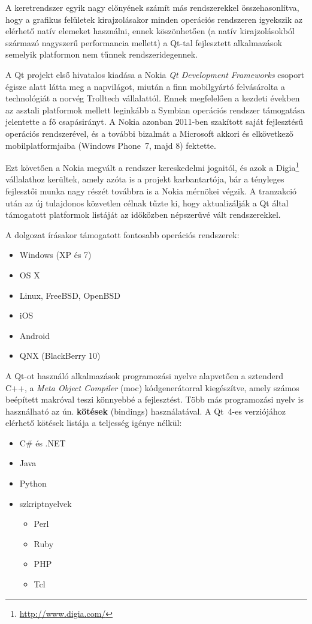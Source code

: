 A keretrendszer egyik nagy előnyének számít más rendszerekkel összehasonlítva, hogy a grafikus felületek kirajzolásakor minden operációs rendszeren igyekszik az elérhető natív elemeket használni, ennek köszönhetően (a natív kirajzolásokból származó nagyszerű performancia mellett) a Qt-tal fejlesztett alkalmazások semelyik platformon nem tűnnek rendszeridegennek.

\bigskip

A Qt projekt első hivatalos kiadása a Nokia \emph{Qt Development Frameworks} csoport égisze alatt látta meg a napvilágot, miután a finn mobilgyártó felvásárolta a technológiát a norvég Trolltech vállalattól. Ennek megfelelően a kezdeti években az asztali platformok mellett leginkább a Symbian operációs rendszer támogatása jelentette a fő csapásirányt. A Nokia azonban 2011-ben szakított saját fejlesztésű operációs rendszerével, és a további bizalmát a Microsoft akkori és elkövetkező mobilplatformjaiba (Windows Phone~7, majd 8) fektette.

Ezt követően a Nokia megvált a rendszer kereskedelmi jogaitól, és azok a Digia\footnote{\url{http://www.digia.com/}} vállalathoz kerültek, amely azóta is a projekt karbantartója, bár a tényleges fejlesztői munka nagy részét továbbra is a Nokia mérnökei végzik. A tranzakció után az új tulajdonos közvetlen célnak tűzte ki, hogy aktualizálják a Qt által támogatott platformok listáját az időközben népszerűvé vált rendszerekkel.

A dolgozat írásakor támogatott fontosabb operációs rendszerek:

\begin{itemize}
  \item Windows (XP és 7)
  \item OS X
  \item Linux, FreeBSD, OpenBSD
  \item iOS
  \item Android
  \item QNX (BlackBerry 10)
\end{itemize}

A Qt-ot használó alkalmazások programozási nyelve alapvetően a sztenderd C++, a \emph{Meta Object Compiler} (moc) kódgenerátorral kiegészítve, amely számos beépített makróval teszi könnyebbé a fejlesztést. Több más programozási nyelv is használható az ún. \textbf{kötések} (bindings) használatával. A Qt~4-es verziójához elérhető kötések listája a teljesség igénye nélkül:

\begin{itemize}
  \item C\# és .NET
  \item Java
  \item Python
  \item szkriptnyelvek
  \begin{itemize}
    \item Perl
    \item Ruby
    \item PHP
    \item Tcl
  \end{itemize}    
   
\end{itemize}

